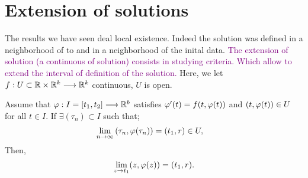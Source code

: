 \section{Extension of solutions}
The results we have seen deal local existence. Indeed the solution was defined in a neighborhood
of to and in a neighborhood of the inital data. \textcolor{purple}{The extension of solution (a continuous of solution)
consists in studying criteria. Which allow to extend the interval of definition of the solution.} 
Here, we let $ f : U \subset \mathbb{R}  \times \mathbb{R} ^k   \longrightarrow \mathbb{R} ^k  $ continuous, $U$ is open. 
\begin{corollary}[]
  Assume that $ \varphi : I = [t_1, t_2] \longrightarrow \mathbb{R} ^{b} $ satisfies $\varphi'(t)  =  f(t, \varphi(t) )$ 
  and $(t, \varphi(t) ) \in  U $ for all $t \in   I $. If $\exists (\tau _n ) \subset I $ such that; 
  \begin{align*}
    \lim_{n \to \infty} \left( \tau _n , \varphi(\tau _n )  \right) &=   
    (t_1, r) \in  U,
  \end{align*}
  Then, 
  \[
  \lim_{z \to t_1} (z, \varphi(z) )  = 
  (t_1, r) .
  \]
\end{corollary}
